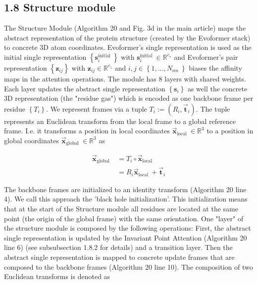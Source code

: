 \documentclass[10pt]{article}
\begin{document}
\subsection*{1.8 Structure module}
The Structure Module (Algorithm 20 and Fig. 3d in the main article) maps the abstract representation of the protein structure (created by the Evoformer stack) to concrete 3D atom coordinates. Evoformer's single representation is used as the initial single representation $\left\{\mathbf{s}_{i}^{\text {initial }}\right\}$ with $\mathbf{s}_{i}^{\text {initial }} \in \mathbb{R}^{c_{s}}$ and Evoformer's pair representation $\left\{\mathbf{z}_{i j}\right\}$ with $\mathbf{z}_{i j} \in \mathbb{R}^{c_{z}}$ and $i, j \in\left\{1, \ldots, N_{\text {res }}\right\}$ biases the affinity maps in the attention operations. The module has 8 layers with shared weights. Each layer updates the abstract single representation $\left\{\mathbf{s}_{i}\right\}$ as well the concrete 3D representation (the "residue gas") which is encoded as one backbone frame per residue $\left\{T_{i}\right\}$. We represent frames via a tuple $T_{i}:=\left(R_{i}, \overrightarrow{\mathbf{t}}_{i}\right)$. The tuple represents an Euclidean transform from the local frame to a global reference frame. I.e. it transforms a position in local coordinates $\overrightarrow{\mathbf{x}}_{\text {local }} \in \mathbb{R}^{3}$ to a position in global coordinates $\overrightarrow{\mathbf{x}}_{\text {global }} \in \mathbb{R}^{3}$ as


\begin{align*}
\overrightarrow{\mathbf{x}}_{\text {global }} & =T_{i} \circ \overrightarrow{\mathbf{x}}_{\text {local }} \\
& =R_{i} \overrightarrow{\mathbf{x}}_{\text {local }}+\overrightarrow{\mathbf{t}}_{i} \tag{2}
\end{align*}


The backbone frames are initialized to an identity transform (Algorithm 20 line 4). We call this approach the 'black hole initialization'. This initialization means that at the start of the Structure module all residues are located at the same point (the origin of the global frame) with the same orientation. One "layer" of the structure module is composed by the following operations: First, the abstract single representation is updated by the Invariant Point Attention (Algorithm 20 line 6) (see subsubsection 1.8.2 for details) and a transition layer. Then the abstract single representation is mapped to concrete update frames that are composed to the backbone frames (Algorithm 20 line 10). The composition of two Euclidean transforms is denoted as
\end{document}
